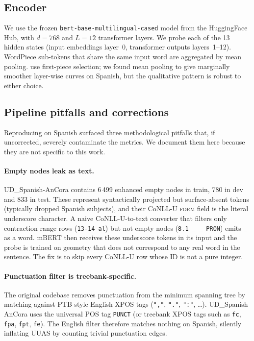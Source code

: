 \documentclass[11pt,a4paper]{article}
\newcommand{\ancora}{UD\_Spanish-AnCora\xspace}
\begin{document}
\subsection{Encoder}

We use the frozen \texttt{bert-base-multilingual-cased} model
\citep{pires2019multilingual} from the HuggingFace Hub, with
$d=768$ and $L=12$ transformer layers. We probe each of the 13 hidden
states (input embeddings layer~0, transformer outputs layers~1--12).
WordPiece sub-tokens that share the same input word are aggregated
by mean pooling. \citet{hewitt2019structural} use first-piece
selection; we found mean pooling to give marginally smoother
layer-wise curves on Spanish, but the qualitative pattern is robust
to either choice.

\subsection{Pipeline pitfalls and corrections}
\label{sec:bugs}

Reproducing \citet{hewitt2019structural} on Spanish surfaced three
methodological pitfalls that, if uncorrected, severely contaminate
the metrics. We document them here because they are not specific
to this work.

\paragraph{Empty nodes leak as text.}
\ancora contains 6\,499 enhanced empty nodes in train, 780 in dev
and 833 in test. These represent syntactically projected but
surface-absent tokens (typically dropped Spanish subjects), and
their CoNLL-U \textsc{form} field is the literal underscore
character. A naive CoNLL-U-to-text converter that filters only
contraction range rows (\texttt{13-14 al}) but not empty nodes
(\texttt{8.1 \_ \_ PRON}) emits \texttt{\_} as a word. mBERT
then receives these underscore tokens in its input and the probe is
trained on geometry that does not correspond to any real word in the
sentence. The fix is to skip every CoNLL-U row whose ID is not a
pure integer.

\paragraph{Punctuation filter is treebank-specific.}
The original codebase removes punctuation from the minimum spanning
tree by matching against PTB-style English XPOS tags
(\texttt{","}, \texttt{"."}, \texttt{":"}, \dots). \ancora uses
the universal POS tag \texttt{PUNCT} (or treebank XPOS tags such as
\texttt{fc}, \texttt{fpa}, \texttt{fpt}, \texttt{fe}). The English
filter therefore matches nothing on Spanish, silently inflating UUAS
by counting trivial punctuation edges.
\end{document}
